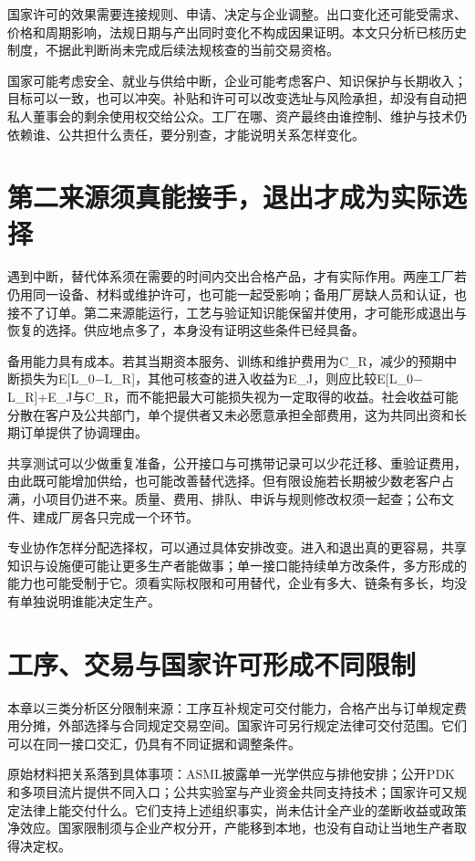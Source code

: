 \documentclass[UTF8,fontset=windows,12pt,a4paper,oneside,openany]{ctexbook}
\begin{document}
国家许可的效果需要连接规则、申请、决定与企业调整。出口变化还可能受需求、价格和周期影响，法规日期与产出同时变化不构成因果证明。本文只分析已核历史制度，不据此判断尚未完成后续法规核查的当前交易资格。

国家可能考虑安全、就业与供给中断，企业可能考虑客户、知识保护与长期收入；目标可以一致，也可以冲突。补贴和许可可以改变选址与风险承担，却没有自动把私人董事会的剩余使用权交给公众。工厂在哪、资产最终由谁控制、维护与技术仍依赖谁、公共担什么责任，要分别查，才能说明关系怎样变化。

\section{第二来源须真能接手，退出才成为实际选择}

遇到中断，替代体系须在需要的时间内交出合格产品，才有实际作用。两座工厂若仍用同一设备、材料或维护许可，也可能一起受影响；备用厂房缺人员和认证，也接不了订单。第二来源能运行，工艺与验证知识能保留并使用，才可能形成退出与恢复的选择。供应地点多了，本身没有证明这些条件已经具备。

备用能力具有成本。若其当期资本服务、训练和维护费用为C\_R，减少的预期中断损失为E[L\_0\ensuremath{-}L\_R]，其他可核查的进入收益为E\_J，则应比较E[L\_0\ensuremath{-}L\_R]+E\_J与C\_R，而不能把最大可能损失视为一定取得的收益。社会收益可能分散在客户及公共部门，单个提供者又未必愿意承担全部费用，这为共同出资和长期订单提供了协调理由。

共享测试可以少做重复准备，公开接口与可携带记录可以少花迁移、重验证费用，由此既可能增加供给，也可能改善替代选择。但有限设施若长期被少数老客户占满，小项目仍进不来。质量、费用、排队、申诉与规则修改权须一起查；公布文件、建成厂房各只完成一个环节。

专业协作怎样分配选择权，可以通过具体安排改变。进入和退出真的更容易，共享知识与设施便可能让更多生产者能做事；单一接口能持续单方改条件，多方形成的能力也可能受制于它。须看实际权限和可用替代，企业有多大、链条有多长，均没有单独说明谁能决定生产。

\section{工序、交易与国家许可形成不同限制}

本章以三类分析区分限制来源：工序互补规定可交付能力，合格产出与订单规定费用分摊，外部选择与合同规定交易空间。国家许可另行规定法律可交付范围。它们可以在同一接口交汇，仍具有不同证据和调整条件。

原始材料把关系落到具体事项：ASML披露单一光学供应与排他安排；公开PDK和多项目流片提供不同入口；公共实验室与产业资金共同支持技术；国家许可又规定法律上能交付什么。它们支持上述组织事实，尚未估计全产业的垄断收益或政策净效应。国家限制须与企业产权分开，产能移到本地，也没有自动让当地生产者取得决定权。
\end{document}
